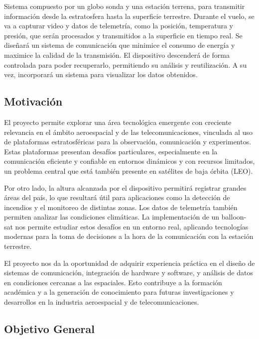 \documentclass[12pt,a4paper]{article}
\begin{document}
Sistema compuesto por un globo sonda y una estación terrena, para transmitir información desde la estratosfera hasta la superficie terrestre. Durante el vuelo, se va a capturar video y datos de telemetría, como la posición, temperatura y presión, que serán procesados y transmitidos a la superficie en tiempo real. Se diseñará un sistema de comunicación que minimice el consumo de energía y maximice la calidad de la transmisión. El dispositivo descenderá de forma controlada para poder recuperarlo, permitiendo su análisis y reutilización. A su vez, incorporará un sistema para visualizar los datos obtenidos.

\subsection{Motivación}\label{motivaciuxf3n}

El proyecto permite explorar una área tecnológica emergente con creciente relevancia en el ámbito aeroespacial y de las telecomunicaciones, vinculada al uso de plataformas estratosféricas para la observación, comunicación y experimentos. Estas plataformas presentan desafíos particulares, especialmente en la comunicación eficiente y confiable en entornos dinámicos y con recursos limitados, un problema central que está también presente en satélites de baja órbita (LEO).

Por otro lado, la altura alcanzada por el dispositivo permitirá registrar grandes áreas del país, lo que resultará útil para aplicaciones como la detección de incendios y el monitoreo de distintas zonas. Los datos de telemetría también permiten analizar las condiciones climáticas. La implementación de un balloon-sat nos permite estudiar estos desafíos en un entorno real, aplicando tecnologías modernas para la toma de decisiones a la hora de la comunicación con la estación terrestre.

El proyecto nos da la oportunidad de adquirir experiencia práctica en el diseño de sistemas de comunicación, integración de hardware y software, y análisis de datos en condiciones cercanas a las espaciales. Esto contribuye a la formación académica y a la generación de conocimiento para futuras investigaciones y desarrollos en la industria aeroespacial y de telecomunicaciones.

\subsection{Objetivo General}\label{objetivo-general}
\end{document}
